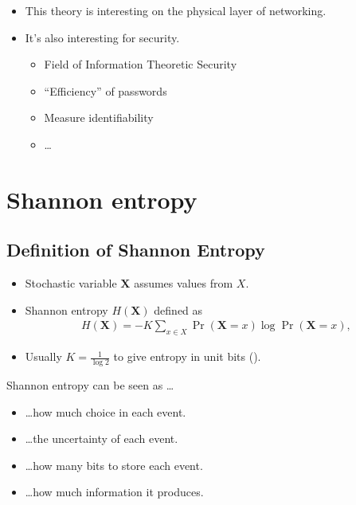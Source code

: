\documentclass{beamer}
\let\stoch\mathbf{}
\begin{document}
\begin{frame}
  \begin{itemize}
    \item This theory is interesting on the physical layer of networking.

      \pause{}

    \item It's also interesting for security.
      \begin{itemize}
        \item Field of Information Theoretic Security
        \item \enquote{Efficiency} of passwords
        \item Measure identifiability
        \item \dots
      \end{itemize}
  \end{itemize}
\end{frame}


\section{Shannon entropy}

\subsection{Definition of Shannon Entropy}

\begin{frame}
  \begin{definition}
    \begin{itemize}
      \item Stochastic variable \(\stoch X\) assumes values from \(X\).
      \item Shannon entropy \(H(\stoch X)\) defined as
        \begin{align*}
          H(\stoch X) = -K \sum_{x\in X} \Pr(\stoch X = x)\log \Pr(\stoch X = x),
        \end{align*}
      \item Usually \(K = \frac{1}{\log 2}\) to give entropy in unit bits  
        (\si{\bit}).
    \end{itemize}
  \end{definition}
\end{frame}

\begin{frame}
  \begin{block}{Shannon entropy can be seen as \dots}
    \begin{itemize}
      \item \dots how much choice in each event.

      \item \dots the uncertainty of each event.

      \item \dots how many bits to store each event.

      \item \dots how much information it produces.

    \end{itemize}
  \end{block}
\end{frame}
\end{document}
